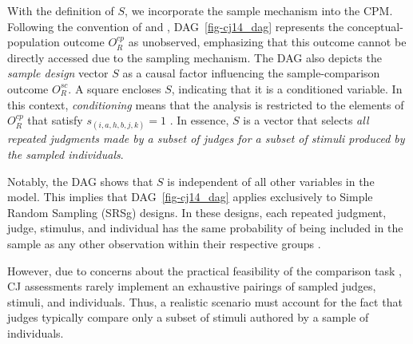\documentclass[
  authoryear,
  review,
  1p]{elsarticle}
\begin{document}
With the definition of \(S\), we incorporate the sample mechanism into
the CPM. Following the convention of \citet{McElreath_2020} and
\citet{Deffner_et_al_2022}, DAG~\ref{fig-cj14_dag} represents the
conceptual-population outcome \(O^{cp}_{R}\) as unobserved, emphasizing
that this outcome cannot be directly accessed due to the sampling
mechanism. The DAG also depicts the \emph{sample design} vector \(S\) as
a causal factor influencing the sample-comparison outcome
\(O^{sc}_{R}\). A square encloses \(S\), indicating that it is a
conditioned variable. In this context, \emph{conditioning} means that
the analysis is restricted to the elements of \(O^{cp}_{R}\) that
satisfy \(s_{(i,a,h,b,j,k)}=1\) \citep{Neal_2020, McElreath_2020}. In
essence, \(S\) is a vector that selects \emph{all repeated judgments
made by a subset of judges for a subset of stimuli produced by the
sampled individuals}.

Notably, the DAG shows that \(S\) is independent of all other variables
in the model. This implies that DAG~\ref{fig-cj14_dag} applies
exclusively to Simple Random Sampling (SRSg) designs. In these designs,
each repeated judgment, judge, stimulus, and individual has the same
probability of being included in the sample as any other observation
within their respective groups \citep{Lawson_2015}.

However, due to concerns about the practical feasibility of the
comparison task \citep{Boonen_et_al_2020}, CJ assessments rarely
implement an exhaustive pairings of sampled judges, stimuli, and
individuals. Thus, a realistic scenario must account for the fact that
judges typically compare only a subset of stimuli authored by a sample
of individuals.
\end{document}
